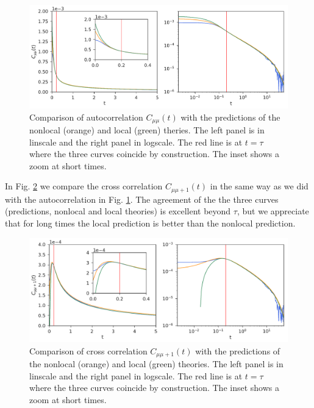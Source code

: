 \documentclass[b5paper,openright,10pt]{book}
\begin{document}
\begin{figure}[h!]
  \centering
\includegraphics[width=\linewidth]{Predictionsmumu-PBC}
\caption[Comparison of autocorrelation $C_{\mu\mu}$ with the predicions for an unconfined fluid]{Comparison of autocorrelation $C_{\mu\mu}(t)$ with the predictions of the nonlocal (orange) and local (green) theries. The left panel is in linscale and the right panel in logscale. The red line is at $t=\tau$ where the three curves coincide by construction. The inset shows a zoom at short times.}
\label{fig:Predictionsmumu-PBC}
\end{figure}

In Fig. \ref{fig:Predictionsmumu+1-PBC} we compare the cross correlation $C_{\mu\mu+1}(t)$ in the same way as we did with the autocorrelation in Fig. \ref{fig:Predictionsmumu-PBC}. The agreement of the the three curves (predictions, nonlocal and local theories) is excellent beyond $\tau$, but we appreciate that for long times the local prediction is better than the nonlocal prediction. 

\begin{figure}[h!]
  \centering
\includegraphics[width=\linewidth]{Predictionsmumu+1-PBC}
\caption[Comparison of cross correlation $C_{\mu\mu+1}$ with the predicions for an unconfined fluid]{Comparison of cross correlation $C_{\mu\mu+1}(t)$ with the predictions of the nonlocal (orange) and local (green) theories. The left panel is in linscale and the right panel in logscale. The red line is at $t=\tau$ where the three curves coincide by construction. The inset shows a zoom at short times.}
\label{fig:Predictionsmumu+1-PBC}
\end{figure}
\end{document}
